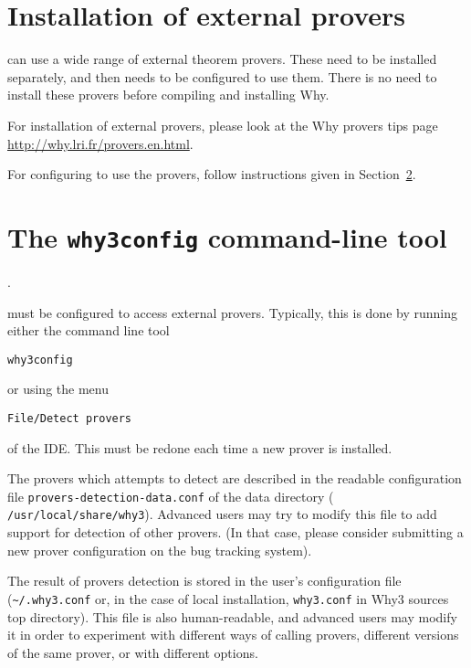 \section{Installation of external provers}\label{provers}

\why can use a wide range of external theorem provers. These need to
be installed separately, and then \why needs to be configured to use
them. There is no need to install these provers before compiling and
installing Why.

For installation of external provers, please look at the Why provers
tips page \url{http://why.lri.fr/provers.en.html}.

For configuring \why to use the provers, follow instructions given in
Section~\ref{sec:why3config}.

\section{The \texttt{why3config} command-line tool}
\label{sec:why3config}.

\why must be configured to access external provers. Typically, this is done
by running either the command line tool
\begin{verbatim}
why3config
\end{verbatim}
or using the menu
\begin{verbatim}
File/Detect provers
\end{verbatim}
of the IDE. This must be redone each time a new prover is installed.

The provers which \why attempts to detect are described in
the readable configuration file \texttt{provers-detection-data.conf}
of the \why data directory (\eg{}
\texttt{/usr/local/share/why3}). Advanced users may try to modify this
file to add support for detection of other provers. (In that case,
please consider submitting a new prover configuration on the bug
tracking system).

The result of provers detection is stored in the user's
configuration file (\verb+~/.why3.conf+ or, in the case of local
installation, \verb+why3.conf+ in Why3 sources top directory). This file
is also human-readable, and advanced users may modify it in order to
experiment with different ways of calling provers, \eg{} different
versions of the same prover, or with different options.

